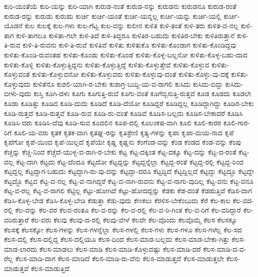 {ಕುರಿ-ಯಂತೆಯೆ
ಕುರಿ-ಯನ್ನು
ಕುರಿ-ಯಾಗಿ
ಕುರುಡ-ನಂತೆ
ಕುರುಡ-ನನ್ನು
ಕುರುಡನು
ಕುರುಡನೂ
ಕುರುಡ-ರಂತೆ
ಕುರುಡ-ರನ್ನು
ಕುರುಡು
ಕುರುಹು
ಕುರ್ಚಿ
ಕುರ್ಚಿ-ಯಂತೆ
ಕುರ್ಚಿ-ಯನ್ನಲ್ಲ
ಕುರ್ಚಿ-ಯನ್ನು
ಕುರ್ಚಿ-ಯಲ್ಲಿ
ಕುರ್ಚಿ-ಯೊಡನೆ
ಕುಲ
ಕುಲಕ್ಕೆ
ಕುಲ-ಗಳು
ಕುಲ-ಗೆಟ್ಟ
ಕುಲ-ವನ್ನು
ಕುಲೀನ
ಕುಳಿತ
ಕುಳಿ-ತಂತೆ
ಕುಳಿ-ತರು
ಕುಳಿತ-ವ-ನಲ್ಲ
ಕುಳಿ-ತಾಗ
ಕುಳಿ-ತಾಗಲೂ
ಕುಳಿತಾ-ಗಲೇ
ಕುಳಿ-ತಿದೆ
ಕುಳಿ-ತಿದ್ದರೂ
ಕುಳಿತಿರ-ಬಹುದು
ಕುಳಿತಿರ-ಬೇಕು
ಕುಳಿತಿರುತ್ತಾನೆ
ಕುಳಿ-ತಿ-ರುವ
ಕುಳಿ-ತಿ-ರುವನು
ಕುಳಿ-ತಿ-ರುವೆ
ಕುಳಿತಿವೆ
ಕುಳಿತು
ಕುಳಿತುಕೊ
ಕುಳಿತು-ಕೊಂಡಾಗ
ಕುಳಿತು-ಕೊಂಡಿದ್ದವು
ಕುಳಿತು-ಕೊಂಡಿ-ರುವಂತಹ
ಕುಳಿತು-ಕೊಂಡು
ಕುಳಿತು-ಕೊಂಡೆ
ಕುಳಿತು-ಕೊಳ್ಳ-ಬಲ್ಲನೋ
ಕುಳಿತು-ಕೊಳ್ಳ-ಬಹು-ದಾದ
ಕುಳಿತು-ಕೊಳ್ಳಿ
ಕುಳಿತು-ಕೊಳ್ಳುತ್ತಿದ್ದನು
ಕುಳಿತು-ಕೊಳ್ಳುತ್ತಿದ್ದೆ
ಕುಳಿತು-ಕೊಳ್ಳುತ್ತೇವೆ
ಕುಳಿತು-ಕೊಳ್ಳುವ
ಕುಳಿತು-ಕೊಳ್ಳುವಂತೆ
ಕುಳಿತು-ಕೊಳ್ಳುವನೋ
ಕುಳಿತು-ಕೊಳ್ಳುವರು
ಕುಳಿತು-ಕೊಳ್ಳುವು-ದಂತೆ
ಕುಳಿತು-ಕೊಳ್ಳು-ವು-ದಕ್ಕೆ
ಕುಳಿತು-ಕೊಳ್ಳುವುದು
ಕುಳಿತೆನೊ
ಕುಶಲಿ-ಯಾಗಿ-ರ-ಬೇಕು
ಕುಶಾಗ್ರ-ಬುದ್ದಿ-ಯ-ವ-ರಾಗಲಿ
ಕುಸಿದು
ಕುಸಿದು-ಬಿದ್ದು
ಕುಸಿದು-ಬೀಳು-ವುದು
ಕುಸ್ತಿ
ಕೂಗಿ-ದಳು
ಕೂಗು
ಕೂಗುತ್ತಿ-ರುವೆ
ಕೂಗು-ವಂತೆ
ಕೂಗೆಬ್ಬಿಸುತ್ತಿ-ರುತ್ತವೆ
ಕೂಡ
ಕೂಡದು
ಕೂಡಲೇ
ಕೂಡಾ
ಕೂಡಿತ್ತು
ಕೂಡಿದ
ಕೂಡಿ-ದುದು
ಕೂಡಿದೆ
ಕೂಡಿ-ದೆಯೋ
ಕೂಡಿದ್ದರೆ
ಕೂಡಿದ್ದಲ್ಲ
ಕೂಡಿದ್ದಾಗಿದ್ದು
ಕೂಡಿರ-ಬೇಕು
ಕೂಡಿ-ರುತ್ತದೆ
ಕೂಡಿ-ರುತ್ತವೆ
ಕೂಡಿ-ರುವ
ಕೂಡಿ-ರು-ವಂತೆ
ಕೂಡಿವೆ
ಕೂಡಿಸ-ಬಲ್ಲದು
ಕೂಡಿಸ-ಬೇಕಾದರೆ
ಕೂಡಿಸಿ
ಕೂಡಿಸಿ-ದರು
ಕೂಡಿಸಿ-ದೆವು
ಕೂಡಿ-ಸುವ
ಕೂದಲಿನ
ಕೂಪ-ದಲ್ಲಿ
ಕೂಲಂಕಷ-ವಾಗಿ
ಕೂಲಿ
ಕೂಲಿ-ಕಾರರ
ಕೂಲಿ-ಗಾರ-ರಿಗೆ
ಕೂಲಿ-ಯ-ವರು
ಕೃತಕ
ಕೃತಕ-ವಾಗಿ
ಕೃತಘ್ನ-ರನ್ನು
ಕೃತಿಶ್ರೇಣಿ
ಕೃತ್ಯ-ಗಳನ್ನು
ಕೃಪಾ
ಕೃಪಾ-ಮಯ-ನಾದ
ಕೃಪೆ
ಕೃಪೆಗೋ
ಕೃಪೆ-ಯಿಂದ
ಕೃಪೆ-ಯಿಲ್ಲದೆ
ಕೃಪೆಯೇ
ಕೃಷ್ಣ
ಕೃಷ್ಣನು
ಕೆಂಗೆಂಡ-ವನ್ನು
ಕೆಂಡ
ಕೆಂಡದ
ಕೆಂಡ-ವನ್ನು
ಕೆಂಪು
ಕೆಚ್ಚನ್ನು
ಕೆಚ್ಚಿ-ನಿಂದ
ಕೆಚ್ಚೆದೆ-ಯುಳ್ಳ-ವ-ರಾಗಿ-ರ-ಬೇಕು
ಕೆಟ್ಟ
ಕೆಟ್ಟ-ದಕ್ಕಿಂತ
ಕೆಟ್ಟ-ದಕ್ಕೂ
ಕೆಟ್ಟ-ದನ್ನು
ಕೆಟ್ಟ-ದ-ರಂತೆ
ಕೆಟ್ಟ-ದಲ್ಲ
ಕೆಟ್ಟ-ದಾಗಿ
ಕೆಟ್ಟದು
ಕೆಟ್ಟ-ದೆಂದೂ
ಕೆಟ್ಟದೋ
ಕೆಟ್ಟದ್ದನ್ನು
ಕೆಟ್ಟದ್ದನ್ನೆಲ್ಲಾ
ಕೆಟ್ಟದ್ದ-ರಂತೆ
ಕೆಟ್ಟದ್ದ-ರಲ್ಲಿ
ಕೆಟ್ಟದ್ದ-ರಿಂದ
ಕೆಟ್ಟದ್ದಲ್ಲ
ಕೆಟ್ಟದ್ದಾಗ-ಬಹುದು
ಕೆಟ್ಟದ್ದಾಗಿ-ರು-ವು-ದನ್ನು
ಕೆಟ್ಟದ್ದಾ-ದರೂ
ಕೆಟ್ಟದ್ದಿದೆ
ಕೆಟ್ಟದ್ದಿಲ್ಲದೆ
ಕೆಟ್ಟದ್ದು
ಕೆಟ್ಟದ್ದೂ
ಕೆಟ್ಟದ್ದೇ
ಕೆಟ್ಟದ್ದೊ
ಕೆಟ್ಟವ
ಕೆಟ್ಟ-ವ-ನಲ್ಲ
ಕೆಟ್ಟ-ವ-ನಾಗಿದ್ದರೆ
ಕೆಟ್ಟ-ವ-ನಾಗಿ-ರುವನು
ಕೆಟ್ಟ-ವ-ನಾಗು-ವುದಿಲ್ಲ
ಕೆಟ್ಟ-ವನು
ಕೆಟ್ಟ-ವನೂ
ಕೆಟ್ಟ-ವ-ರಲ್ಲ
ಕೆಟ್ಟ-ವ-ರಾಗಲಿ
ಕೆಟ್ಟಿಲ್ಲ
ಕೆಟ್ಟು-ಹೋಗಿದೆ
ಕೆಟ್ಟು-ಹೋದದ್ದನ್ನು
ಕೆಡಕು
ಕೆಡ-ದಂತೆ
ಕೆಡಹುತ್ತಿದೆ
ಕೆಡಿಸ-ದಾಗ
ಕೆಡಿಸಿ-ಕೊಳ್ಳ-ಬೇಡ
ಕೆಡಿಸಿ-ಕೊಳ್ಳ-ಬೇಡಿ
ಕೆಡುತ್ತಾ
ಕೆಡು-ವುದು
ಕೆಣಕಲು
ಕೆರಳಿಸ-ಬೇಕೆಂಬುದು
ಕೆರೆ
ಕೆಲ-ಕಾಲ
ಕೆಲ-ವದ-ರಲ್ಲಿ
ಕೆಲ-ವನ್ನು
ಕೆಲ-ವರ
ಕೆಲವ-ರಂತೂ
ಕೆಲ-ವ-ರನ್ನು
ಕೆಲ-ವ-ರಲ್ಲಿ
ಕೆಲ-ವ-ರಿ-ಗಿಂತ
ಕೆಲ-ವ-ರಿಗೆ
ಕೆಲ-ವರಿದ್ದಾರೆ
ಕೆಲ-ವರಿರುತ್ತಾರೆ
ಕೆಲ-ವರು
ಕೆಲವು
ಕೆಲವು-ದ-ರಲ್ಲಿ
ಕೆಲವು-ವೇಳೆ
ಕೆಲವೇ
ಕೆಲ-ವೊಂದು
ಕೆಲವೊಮ್ಮೆ
ಕೆಲಸ
ಕೆಲಸಕ್ಕೂ
ಕೆಲಸಕ್ಕೆ
ಕೆಲಸಕ್ಕೋ
ಕೆಲಸ-ಗಳನ್ನು
ಕೆಲಸ-ಗಳನ್ನೆಲ್ಲಾ
ಕೆಲಸ-ಗಳಲ್ಲಿ
ಕೆಲಸ-ಗಳು
ಕೆಲಸ-ಗಳೂ
ಕೆಲಸ-ಗಳೆಲ್ಲ
ಕೆಲ-ಸದ
ಕೆಲಸ-ದಲ್ಲಿ
ಕೆಲಸ-ದಲ್ಲಿದ್ದ
ಕೆಲಸ-ದಲ್ಲಿಯೂ
ಕೆಲಸ-ದಿಂದ
ಕೆಲಸ-ಮಾಡ-ಬಲ್ಲದು
ಕೆಲಸ-ಮಾಡ-ಬೇಕಾ-ಗಿತ್ತು
ಕೆಲಸ-ಮಾಡ-ಲಾರದು
ಕೆಲಸ-ಮಾಡಲು
ಕೆಲಸ-ಮಾಡಿ
ಕೆಲಸ-ಮಾಡಿ-ಕೊಳ್ಳುವಷ್ಟು
ಕೆಲಸ-ಮಾಡಿ-ದರೆ
ಕೆಲಸ-ಮಾಡಿ-ದ-ವ-ರೆಲ್ಲ
ಕೆಲಸ-ಮಾಡಿ-ದಾಗ
ಕೆಲಸ-ಮಾಡಿದೆ
ಕೆಲಸ-ಮಾಡಿ-ರು-ವೆನು
ಕೆಲಸ-ಮಾಡುತ್ತದೆ
ಕೆಲಸ-ಮಾಡುತ್ತಲೇ
ಕೆಲಸ-ಮಾಡುತ್ತವೆ
ಕೆಲಸ-ಮಾಡುತ್ತಿದೆ
}
